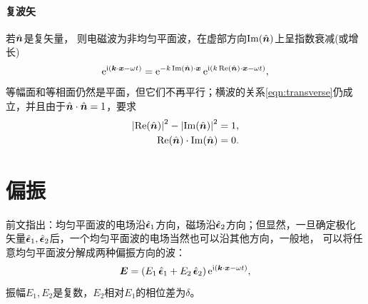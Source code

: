 \paragraph{复波矢}
若$\uvec n$是复矢量，
则电磁波为非均匀平面波，在虚部方向$\Im(\uvec n)$上呈指数衰减(或增长)
\[
    \e{\i(\bm k\cdot\bm x-\omega t)}=\e{-k\Im(\uvec n)\cdot\bm x}\e{\i(k\Re(\uvec n)\cdot\bm x-\omega t)},
\]
等幅面和等相面仍然是平面，但它们不再平行；横波的关系\eqref{eqn:transverse}仍成立，并且由于$\uvec n\cdot\uvec n=1$，要求
\begin{subequations}
    \begin{align}
        \abs{\Re(\uvec n)}^2-\abs{\Im(\uvec n)}^2&=1,\\
        \Re(\uvec n)\cdot\Im(\uvec n)&=0.
    \end{align}
\end{subequations}

\section{偏振}

前文指出：均匀平面波的电场沿$\uvec\epsilon_1$方向，磁场沿$\uvec\epsilon_2$方向；但显然，一旦确定极化矢量$\uvec\epsilon_1,\uvec\epsilon_2$后，一个均匀平面波的电场当然也可以沿其他方向，一般地，
可以将任意均匀平面波分解成两种偏振方向的波：
\[
    \bm E=(E_1\uvec\epsilon_1+E_2\uvec\epsilon_2)\e{\i(\bm k\cdot\bm x-\omega t)},
\]
振幅$E_1,E_2$是复数，$E_2$相对$E_1$的相位差为$\delta$。
